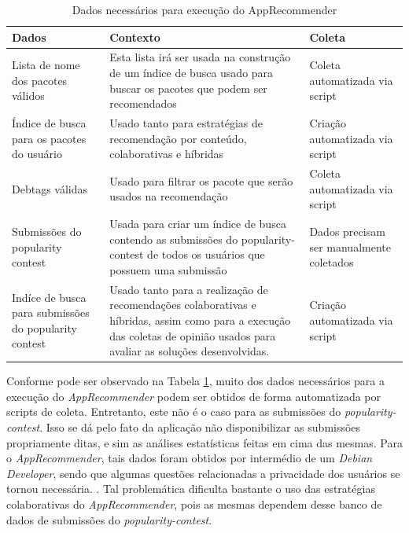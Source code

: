   \begin{table}[h]
  \centering
  \caption{Dados necessários para execução do AppRecommender}
  \label{tab:dados_apprecommender}
  \begin{tabularx}{\textwidth}{|X|X|X|}
  \hline
  \rowcolor[HTML]{EFEFEF}
  {\textbf{Dados}} & {\textbf{Contexto}} & {\textbf{Coleta}} \\ \hline
  Lista de nome dos pacotes válidos &
  Esta lista irá ser usada na construção de um índice de busca
  usado para buscar os pacotes que podem ser recomendados &
  Coleta automatizada via script \\
  \hline
  Índice de busca para os pacotes do usuário &
  Usado tanto para estratégias de recomendação por conteúdo,
  colaborativas e híbridas &
  Criação automatizada via script\\
  \hline
  Debtags válidas &
  Usado para filtrar os pacote que serão usados na
  recomendação &
  Coleta automatizada via script\\
  \hline
  Submissões do popularity contest &
  Usada para criar um índice de busca contendo as submissões do
  popularity-contest de todos os usuários que possuem uma submissão &
  Dados precisam ser manualmente coletados \\
  \hline
  Indíce de busca para submissões do popularity contest &
  Usado tanto para a realização de recomendações colaborativas e
  híbridas, assim como para a execução das coletas de opinião usados
  para avaliar as soluções desenvolvidas. &
  Criação automatizada via script \\
  \hline
  \end{tabularx}
  \end{table}

  Conforme pode ser observado na Tabela \ref{tab:dados_apprecommender}, muito dos dados
  necessários para a execução do \textit{AppRecommender} podem ser obtidos de forma automatizada
  por scripts de coleta. Entretanto, este não é o caso para as submissões do
  \textit{popularity-contest}. Isso se dá pelo fato da aplicação não disponibilizar as submissões
propriamente ditas, e sim as análises estatísticas feitas em cima das mesmas. Para o
\textit{AppRecommender}, tais dados foram obtidos por intermédio de um
\textit{Debian Developer}, sendo que algumas questões relacionadas a privacidade dos usuários se tornou necessária.
\cite{araujo2011apprecommender}. Tal problemática dificulta bastante o uso das
estratégias colaborativas do \textit{AppRecommender}, pois as mesmas dependem desse banco de dados
de submissões do \textit{popularity-contest}.

